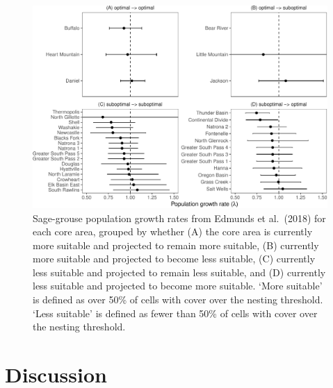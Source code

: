 \documentclass[
  12pt,
]{article}
\begin{document}
\begin{figure}
\centering
\includegraphics{sageCastManuscript_files/figure-latex/lambda-compares-1.pdf}
\caption{\label{fig:lambda-compares}Sage-grouse population growth rates from Edmunds et al.~(2018) for each core area, grouped by whether (A) the core area is currently more suitable and projected to remain more suitable, (B) currently more suitable and projected to become less suitable, (C) currently less suitable and projected to remain less suitable, and (D) currently less suitable and projected to become more suitable. `More suitable' is defined as over 50\% of cells with cover over the nesting threshold. `Less suitable' is defined as fewer than 50\% of cells with cover over the nesting threshold.}
\end{figure}

\hypertarget{discussion}{%
\section{Discussion}\label{discussion}}
\end{document}
